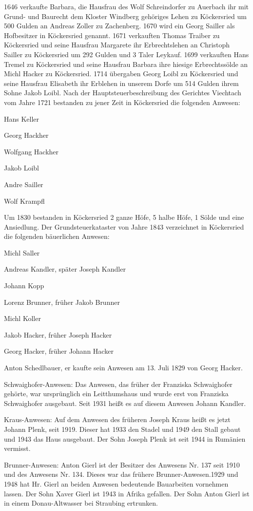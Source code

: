 \documentclass[12pt,a4pager]{book}
\begin{document}
1646 verkaufte Barbara, die Hausfrau des Wolf Schreindorfer zu Auerbach ihr mit
Grund- und Baurecht dem Kloster Windberg gehöriges Lehen zu Köckersried um 500
Gulden an Andreas Zoller zu Zachenberg. 1670 wird ein Georg Sailler als
Hofbesitzer in Köckersried genannt. 1671 verkauften Thomas Traiber zu
Köckersried und seine Hausfrau Margarete ihr Erbrechtslehen an Christoph Sailler
zu Köckersried um 292 Gulden und 3 Taler Leykauf. 1699 verkauften Hans Tremel zu
Köckersried und seine Hausfrau Barbara ihre hiesige Erbrechtssölde an Michl
Hacker zu Köckersried. 1714 übergaben Georg Loibl zu Köckersried und seine
Hausfrau Elisabeth ihr Erblehen in unserem Dorfe um 514 Gulden ihrem Sohne Jakob
Loibl. Nach der Hauptsteuerbeschreibung des Gerichtes Viechtach vom Jahre 1721
bestanden zu jener Zeit in Köckersried die folgenden Anwesen:

Hans Keller

Georg Hackher

Wolfgang Hackher

Jakob Loibl

Andre Sailler

Wolf Krampfl

Um 1830 bestanden in Köckersried 2 ganze Höfe, 5 halbe Höfe, 1 Sölde und eine
Ansiedlung. Der Grundsteuerkataster von Jahre 1843 verzeichnet in Köckersried
die folgenden bäuerlichen Anwesen:

Michl Saller

Andreas Kandler, später Joseph Kandler

Johann Kopp

Lorenz Brunner, früher Jakob Brunner

Michl Koller

Jakob Hacker, früher Joseph Hacker

Georg Hacker, früher Johann Hacker

Anton Schedlbauer, er kaufte sein Anwesen am 13. Juli 1829 von Georg Hacker.

Schwaighofer-Anwesen: Das Anwesen, das früher der Franziska Schwaighofer
gehörte, war ursprünglich ein Leitthumshaus und wurde erst von Franziska
Schwaighofer ausgebaut. Seit 1931 heißt es auf diesem Anwesen Johann Kandler.

Kraus-Anwesen: Auf dem Anwesen des früheren Joseph Kraus heißt es jetzt Johann
Plenk, seit 1919. Dieser hat 1933 den Stadel und 1949 den Stall gebaut und 1943
das Haus ausgebaut. Der Sohn Joseph Plenk ist seit 1944 in Rumänien vermisst.

Brunner-Anwesen: Anton Gierl ist der Besitzer des Anwesens Nr. 137 seit 1910 und
des Anwesens Nr. 134. Dieses war das frühere Brunner-Anwesen.1929 und 1948 hat
Hr. Gierl an beiden Anwesen bedeutende Bauarbeiten vornehmen lassen. Der Sohn
Xaver Gierl ist 1943 in Afrika gefallen. Der Sohn Anton Gierl ist in einem
Donau-Altwasser bei Straubing ertrunken.
\end{document}
